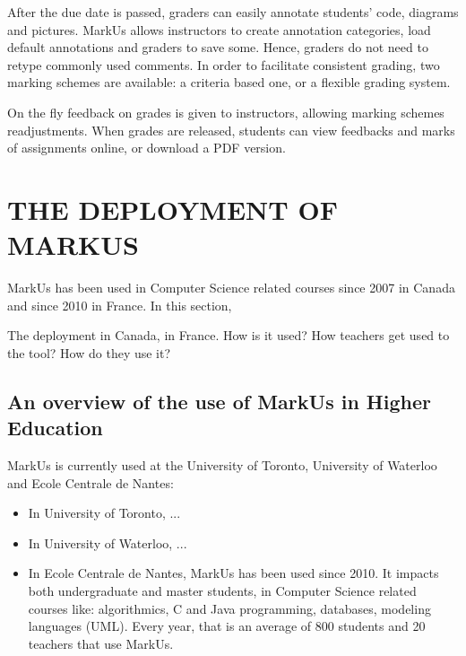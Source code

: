 \documentclass[twocolumn,10pt]{asme2e}
\begin{document}
After the due date is passed, graders can easily annotate students' code,
diagrams and pictures. MarkUs allows instructors to create annotation
categories, load default annotations and graders to save some. Hence, graders
do not need to retype commonly used comments. In order to facilitate
consistent grading, two marking schemes are available: a criteria based one,
or a flexible grading system.

On the fly feedback on grades is given to instructors, allowing marking
schemes readjustments. When grades are released, students can view feedbacks
and marks of assignments online, or download a PDF version.


\section*{THE DEPLOYMENT OF MARKUS}

MarkUs has been used in Computer Science related courses since 2007 in Canada and since 2010 in France. In this section, 

The deployment in Canada, in France. How is it used? How teachers get used to the tool? How do they use it?

\subsection*{An overview of the use of MarkUs in Higher Education}

MarkUs is currently used at the University of Toronto, University of Waterloo and Ecole Centrale de Nantes: 
\begin{itemize}
\item In University of Toronto, ... %
\item In University of Waterloo, ... %
\item In Ecole Centrale de Nantes, MarkUs has been used since 2010. It impacts both undergraduate and master students, in Computer Science related courses like: algorithmics, C and Java programming, databases, modeling languages (UML). Every year, that is an average of 800 students and 20 teachers that use MarkUs. %
\end{itemize}
\end{document}
